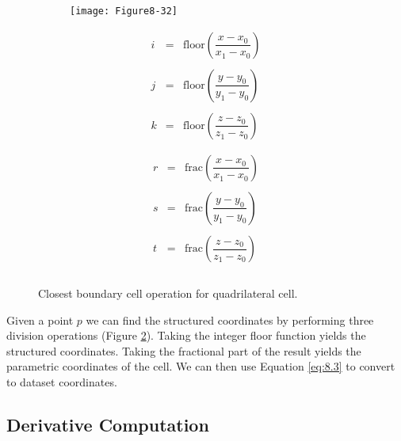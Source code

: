 \begin{figure}[!htb]
    \centering
    \begin{subfigure}{0.48\linewidth}
        \centering
        \texttt{[image: Figure8-32]}
        \caption*{}\label{fig:Figure8-32a}
    \end{subfigure}
    \hfill
    \begin{subfigure}{0.48\linewidth}
    \begin{equation*}
        \begin{array}{lll}
        i &=& \text{floor}(\dfrac{x - x_0}{x_1 - x_0}) \\ \\
        j &=& \text{floor}(\dfrac{y - y_0}{y_1 - y_0}) \\ \\
        k &=& \text{floor}(\dfrac{z - z_0}{z_1 - z_0}) \\ \\
    \end{array}
    \end{equation*}
    \begin{equation*}
        \begin{array}{lll}
        r &=& \text{frac}(\dfrac{x - x_0}{x_1 - x_0}) \\ \\
        s &=& \text{frac}(\dfrac{y - y_0}{y_1 - y_0}) \\ \\
        t &=& \text{frac}(\dfrac{z - z_0}{z_1 - z_0}) \\ \\
    \end{array}
    \end{equation*}
    \end{subfigure}%
    \caption{Closest boundary cell operation for quadrilateral cell.}
    \label{fig:Figure8-32}
\end{figure}


Given a point $p$ we can find the structured coordinates by performing three division operations (Figure \ref{fig:Figure8-32}). Taking the integer floor function yields the structured coordinates. Taking the fractional part of the result yields the parametric coordinates of the cell. We can then use Equation \ref{eq:8.3} to convert to dataset coordinates.

\subsection{Derivative Computation}

